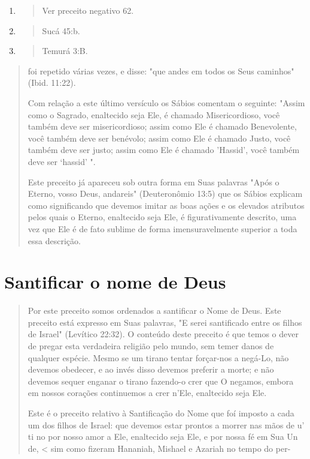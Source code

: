 \begin{enumerate}
\def\labelenumi{\arabic{enumi}.}
\setcounter{enumi}{30}
\item
 \begin{quote}
 Ver preceito negativo 62.
 \end{quote}
\item
 \begin{quote}
 Sucá 45:b.
 \end{quote}
\item
 \begin{quote}
 Temurá 3:B.
 \end{quote}
\end{enumerate}

\begin{quote}


foi repetido várias vezes, e disse: "que andes em todos os Seus
caminhos" (Ibid. 11:22).

Com relação a este último versículo os Sábios comentam o seguinte:
"Assim como o Sagrado, enaltecido seja Ele, é chamado Misericordioso,
você também deve ser misericordioso; assim como Ele é chamado
Benevolente, vo­cê também deve ser benévolo; assim como Ele é chamado
Justo, você também deve ser justo; assim como Ele é chamado 'Hassid',
você também deve ser `hassid' ".

Este preceito já apareceu sob outra forma em Suas palavras "Após o
Eterno, vosso Deus, andareis" (Deuteronômio 13:5) que os Sábios explicam
como significando que devemos imitar as boas ações e os elevados
atributos pelos quais o Eterno, enaltecido seja Ele, é figurativamente
descrito, uma vez que Ele é de fato sublime de forma imensuravelmente
superior a toda essa descrição.
\end{quote}

\section{Santificar o nome de Deus}

\begin{quote}
Por este preceito somos ordenados a santificar o Nome de Deus. Es­te
preceito está expresso em Suas palavras, "E serei santificado entre os
filhos de Israel" (Levítico 22:32). O conteúdo deste preceito é que
temos o dever de pregar esta verdadeira religião pelo mundo, sem temer
danos de qualquer es­pécie. Mesmo se um tirano tentar forçar-nos a
negá-Lo, não devemos obede­cer, e ao invés disso devemos preferir a
morte; e não devemos sequer enganar o tirano fazendo-o crer que O
negamos, embora em nossos corações continue­mos a crer n'Ele, enaltecido
seja Ele.

Este é o preceito relativo à Santificação do Nome que foí imposto a cada
um dos filhos de Israel: que devemos estar prontos a morrer nas mãos de
u' ti no por nosso amor a Ele, enaltecido seja Ele, e por nossa fé em
Sua Un de, \textless{} sim como fizeram Hananiah, Mishael e Azariah no
tempo do per-
\end{quote}

